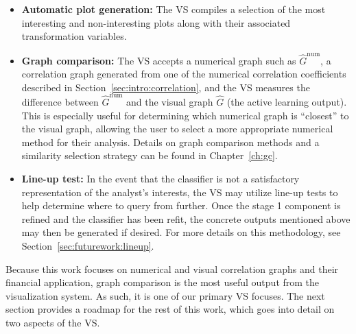 \tablespacing
\begin{itemize}
	\item \textbf{Automatic plot generation:} The VS compiles a selection of 
	the most interesting and non-interesting plots along with their 
	associated transformation variables.
	
	\item \textbf{Graph comparison:} The VS accepts a numerical graph such as 
	$\hat{G}^{\text{num}}$, a correlation graph generated from one of the 
	numerical correlation coefficients described in 
	Section~\ref{sec:intro:correlation}, and the VS measures the difference 
	between $\hat{G}^{\text{num}}$ and the visual graph $\hat{G}$ (the active 
	learning output). This is especially useful 
	for determining which numerical graph is ``closest'' to the visual graph, 
	allowing the user to select a more appropriate numerical method for their 
	analysis. Details on graph comparison methods and a similarity 
	selection strategy can be found in Chapter~\ref{ch:gc}.
	
	\item \textbf{Line-up test:} In the event that the classifier is not a 
	satisfactory representation of the analyst's interests, the VS may utilize 
	line-up tests to help determine where to query from further. Once the stage 
	1 component is refined and the classifier has been refit, the concrete 
	outputs mentioned above may then be generated if desired. For more 
	details on this methodology, see Section~\ref{sec:futurework:lineup}.
\end{itemize}
\bodyspacing

Because this work focuses on numerical and visual correlation graphs and their 
financial application, graph comparison is 
the most useful output from the visualization system. As such, it is one of our 
primary VS focuses. The next section provides a roadmap for the rest of this 
work, which goes into detail on two aspects of the VS. 